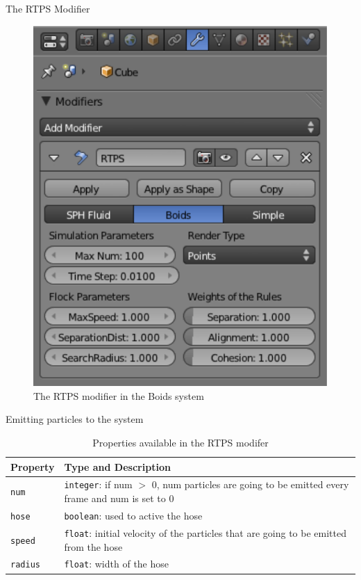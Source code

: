 \documentclass[red]{beamer}
\begin{document}
\begin{frame}{The RTPS Modifier}
	\begin{figure}[htbp]
	\begin{center}
	\includegraphics[scale=0.35]{../figures/modifier.pdf}
	\caption{The RTPS modifier in the Boids system}
	\end{center}
	\end{figure}
\end{frame}

\begin{frame}{Emitting particles to the system}
	\begin{table}[htdp]
	\caption{Properties available in the RTPS modifer}
	\begin{center}
	\begin{tabular}{|p{2cm}|p{6cm}|}
	\hline 
	\textbf{Property} & \textbf{Type and Description} \\\hline 
	\texttt{num} 	& \texttt{integer}: if num $>$ 0, num particles are going to be emitted every frame and num is set to 0	\\\hline 
	\texttt{hose}	& \texttt{boolean}: used to active the hose	\\\hline
	\texttt{speed}	& \texttt{float}: initial velocity of the particles that are going to be emitted from the hose	\\\hline
	\texttt{radius}	& \texttt{float}: width of the hose	\\
	\hline 
	\end{tabular}
	\end{center}
	\end{table}
\end{frame}
\end{document}
